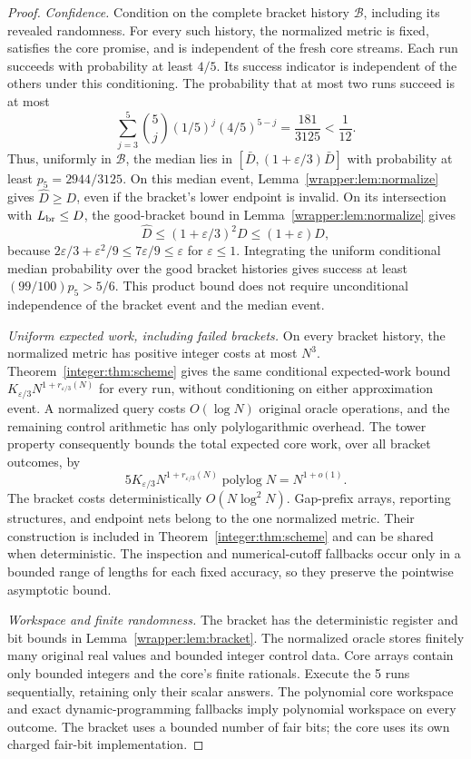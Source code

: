 \documentclass[11pt]{article}
\theoremstyle{definition}
\newcommand{\eps}{\varepsilon}
\newcommand{\1}{\mathbf 1}
\begin{document}
\begin{proof}
\emph{Confidence.} Condition on the complete bracket history
$\mathcal B$, including its revealed randomness. For every such history,
the normalized metric is fixed, satisfies the core promise, and is
independent of the fresh core streams. Each run succeeds with probability
at least $4/5$. Its success indicator is independent of the others under
this conditioning. The probability that at most two runs succeed is at
most
\[
\sum_{j=3}^{5}\binom{5}{j}(1/5)^j(4/5)^{5-j}
=\frac{181}{3125}<\frac1{12}.
\]
Thus, uniformly in $\mathcal B$, the median lies in
$[\bar D,(1+\eps/3)\bar D]$ with probability at least
$p_5=2944/3125$.
On this median event, Lemma~\ref{wrapper:lem:normalize} gives
$\widehat D\ge D$, even if the bracket's lower endpoint is invalid.
On its intersection with $L_{\rm br}\le D$, the good-bracket bound in Lemma~\ref{wrapper:lem:normalize} gives
\[
\widehat D\le(1+\eps/3)^2D\le(1+\eps)D,
\]
because $2\eps/3+\eps^2/9\le7\eps/9\le\eps$ for $\eps\le1$.
Integrating the uniform conditional median probability over the good
bracket histories gives success at least $(99/100)p_5>5/6$.
This product bound does not require unconditional independence of the
bracket event and the median event.

\emph{Uniform expected work, including failed brackets.}
On every bracket history, the normalized metric has positive integer
costs at most $N^3$. Theorem~\ref{integer:thm:scheme} gives the same
conditional expected-work bound
$K_{\eps/3}N^{1+r_{\eps/3}(N)}$ for every run, without conditioning on
either approximation event. A normalized query costs $O(\log N)$ original
oracle operations, and the remaining control arithmetic has only
polylogarithmic overhead. The tower property consequently bounds the
total expected core work, over all bracket outcomes, by
\[
5K_{\eps/3}N^{1+r_{\eps/3}(N)}\operatorname{polylog}N
=N^{1+o(1)}.
\]
The bracket costs deterministically $O(N\log^2N)$. Gap-prefix arrays,
reporting structures, and endpoint nets belong to the one normalized
metric. Their construction is included in Theorem~\ref{integer:thm:scheme} and can be
shared when deterministic. The inspection and numerical-cutoff fallbacks
occur only in a bounded range of lengths for each fixed accuracy, so
they preserve the pointwise asymptotic bound.

\emph{Workspace and finite randomness.}
The bracket has the deterministic register and bit bounds in
Lemma~\ref{wrapper:lem:bracket}. The normalized oracle stores finitely many
original real values and bounded integer control data. Core arrays contain
only bounded integers and the core's finite rationals. Execute the 5
runs sequentially, retaining only their scalar answers. The
polynomial core workspace and exact dynamic-programming fallbacks imply
polynomial workspace on every outcome. The bracket uses a bounded number
of fair bits; the core uses its own charged fair-bit implementation.
\end{proof}
\end{document}
